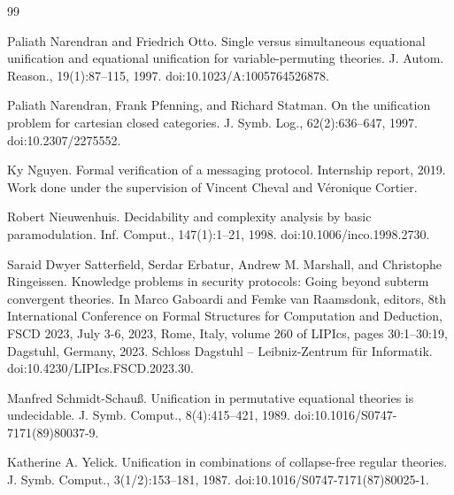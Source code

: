 \documentclass[10pt,a4paper]{amsart}
\begin{document}
\begin{thebibliography}{99}
\par\noindent  [21]  Paliath Narendran and Friedrich Otto.  Single versus simultaneous equational unification and equational unification for variable-permuting theories.  J. Autom. Reason., 19(1):87–115, 1997.  doi:10.1023/A:1005764526878.  
 
\par\noindent  [22]  Paliath Narendran, Frank Pfenning, and Richard Statman.  On the unification problem for cartesian closed categories.  J. Symb. Log., 62(2):636–647, 1997.  doi:10.2307/2275552.  
 
\par\noindent  [23]  Ky Nguyen.  Formal verification of a messaging protocol.  Internship report, 2019.  Work done under the supervision of Vincent Cheval and Véronique Cortier.  
 
\par\noindent  [24]  Robert Nieuwenhuis.  Decidability and complexity analysis by basic paramodulation.  Inf. Comput., 147(1):1–21, 1998.  doi:10.1006/inco.1998.2730.  
 
\par\noindent  [25]  Saraid Dwyer Satterfield, Serdar Erbatur, Andrew M. Marshall, and Christophe Ringeissen.  Knowledge problems in security protocols: Going beyond subterm convergent theories.  In Marco Gaboardi and Femke van Raamsdonk, editors, 8th International Conference on Formal Structures for Computation and Deduction, FSCD 2023, July 3-6, 2023, Rome, Italy, volume 260 of LIPIcs, pages 30:1–30:19, Dagstuhl, Germany, 2023. Schloss Dagstuhl – Leibniz-Zentrum für Informatik.  doi:10.4230/LIPIcs.FSCD.2023.30.  
 
\par\noindent  [26]  Manfred Schmidt-Schauß.  Unification in permutative equational theories is undecidable.  J. Symb. Comput., 8(4):415–421, 1989.  doi:10.1016/S0747-7171(89)80037-9.  
 
\par\noindent  [27]  Katherine A. Yelick.  Unification in combinations of collapse-free regular theories.  J. Symb. Comput., 3(1/2):153–181, 1987.  doi:10.1016/S0747-7171(87)80025-1.  
  
\end{thebibliography}
\end{document}
